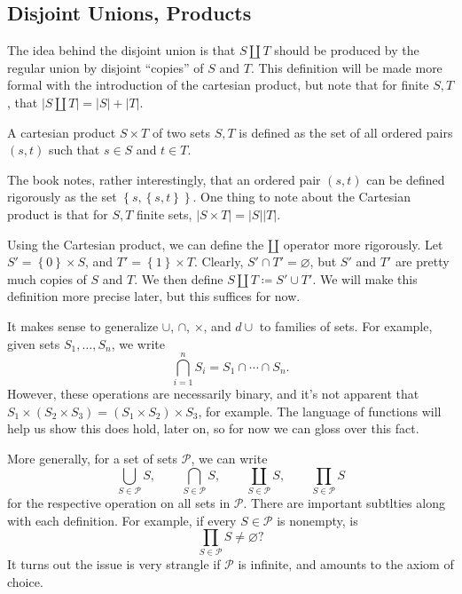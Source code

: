 \subsection{Disjoint Unions, Products}
The idea behind the disjoint union is that $S\amalg T$ should be produced by the regular union by disjoint ``copies'' of $S$ and $T$. This definition will be made more formal with the introduction of the cartesian product, but note that for finite $S,T$, that $\left| S\amalg T \right| =\left| S \right| +\left| T \right| $.

\begin{definition}\label{dfn:1.8}
	A cartesian product $S\times T$ of two sets $S,T$ is defined as the set of all ordered pairs $(s,t)$ such that $s\in S$ and $t\in T$.
\end{definition}
The book notes, rather interestingly, that an ordered pair  $(s,t)$ can be defined rigorously as the set $\left\{ s,\left\{ s,t \right\}  \right\} $. One thing to note about the Cartesian product is that for $S,T$ finite sets, $\left| S\times T \right| =\left| S \right| \left| T \right| $.

Using the Cartesian product, we can define the $\amalg $ operator more rigorously. Let $S'=\left\{ 0 \right\} \times S$, and $T'=\left\{ 1 \right\} \times T$. Clearly, $S'\cap T'=\varnothing$, but $S'$ and $T'$ are pretty much copies of $S$ and $T$. We then define $S\amalg T\coloneqq S'\cup T'$. We will make this definition more precise later, but this suffices for now.

It makes sense to generalize $\cup $, $\cap $, $\times $, and $d\cup $ to families of sets. For example, given sets $S_1, \ldots, S_n$, we write
\[
	\bigcap_{i=1}^{n} S_i = S_1 \cap \cdots \cap S_n
.\]
However, these operations are necessarily binary, and it's not apparent that $S_1 \times \left( S_2 \times S_3 \right) =\left( S_1 \times S_2 \right) \times S_3$, for example. The language of functions will help us show this does hold, later on, so for now we can gloss over this fact.

More generally, for a set of sets $\mathscr{P} $, we can write
\[
	\bigcup_{S\in \mathscr{P} }S,\qquad  \bigcap_{S\in \mathscr{P} }S,\qquad \coprod_{S\in \mathscr{P} }S,\qquad \prod_{S\in \mathscr{P} }S 
\]
for the respective operation on all sets in $\mathscr{P} $. There are important subtlties along with each definition. For example, if every  $S\in \mathscr{P} $ is nonempty, is
\[
	\prod_{S\in \mathscr{P} } S  \neq \varnothing?
\]
It turns out the issue is very strangle if $\mathscr{P} $ is infinite, and amounts to the axiom of choice.
